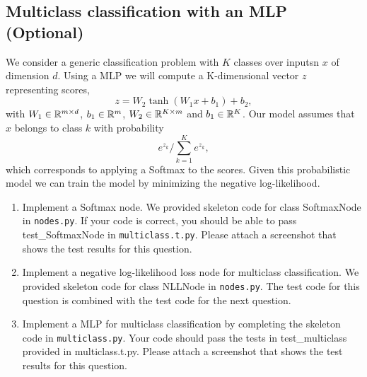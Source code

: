 \documentclass{article}
\theoremstyle{plain}
\theoremstyle{definition}
\begin{document}
\subsection{Multiclass classification with an MLP (Optional)}
We consider a generic classification problem with $K$ classes over inputsn 
$x$ of dimension $d$. Using a MLP we will compute a K-dimensional vector $z$ representing scores, 
$$
z = W_2 \tanh (W_1 x + b_1) + b_2,
$$
with $W_1 \in \mathbb{R}^{m\times d}$, $b_1 \in \mathbb{R}^m$, $W_2 \in \mathbb{R}^{K \times m}$ and $b_1 \in \mathbb{R}^K$.
Our model assumes that $x$ belongs to class $k$ with probability $$ e^{z_k}/\sum_{k=1}^K e^{z_k},$$
which corresponds to applying a Softmax to the scores. Given this probabilistic model we can train the model by minimizing the negative log-likelihood.
\begin{enumerate}
\setcounter{enumi}{\value{saveenum}}
\item Implement a Softmax node. We provided skeleton code for class SoftmaxNode in \texttt{nodes.py}. If your code is correct, you should be able to pass test\_SoftmaxNode in \texttt{multiclass.t.py}. Please attach a screenshot that shows the test results for this question.
\item Implement a negative log-likelihood loss node for multiclass
classification. We provided skeleton code for class NLLNode in \texttt{nodes.py}. The test code for this question is combined with the test code for the next question.
\item Implement a MLP for multiclass classification by completing the skeleton code in \texttt{multiclass.py}. Your code should pass the tests in test\_multiclass provided in multiclass.t.py. Please attach a screenshot that shows the test results for this question.
\setcounter{saveenum}{\value{enumi}}
\end{enumerate}
\end{document}
